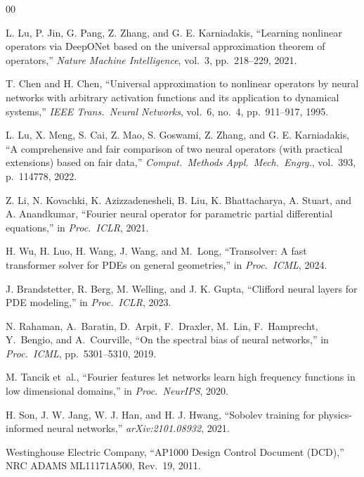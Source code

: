 \documentclass[journal]{IEEEtran}
\begin{document}
\begin{thebibliography}{00}

L. Lu, P. Jin, G. Pang, Z. Zhang, and G. E. Karniadakis,
``Learning nonlinear operators via DeepONet based on the universal approximation theorem of operators,''
\textit{Nature Machine Intelligence}, vol.~3, pp.~218--229, 2021.

T. Chen and H. Chen,
``Universal approximation to nonlinear operators by neural networks with arbitrary activation functions and its application to dynamical systems,''
\textit{IEEE Trans.\ Neural Networks}, vol.~6, no.~4, pp.~911--917, 1995.

L. Lu, X. Meng, S. Cai, Z. Mao, S. Goswami, Z. Zhang, and G. E. Karniadakis,
``A comprehensive and fair comparison of two neural operators (with practical extensions) based on fair data,''
\textit{Comput.\ Methods Appl.\ Mech.\ Engrg.}, vol.~393, p.~114778, 2022.

Z. Li, N. Kovachki, K. Azizzadenesheli, B. Liu, K. Bhattacharya, A. Stuart, and A. Anandkumar,
``Fourier neural operator for parametric partial differential equations,''
in \textit{Proc.\ ICLR}, 2021.

H. Wu, H. Luo, H. Wang, J. Wang, and M.~Long,
``Transolver: A fast transformer solver for PDEs on general geometries,''
in \textit{Proc.\ ICML}, 2024.

J. Brandstetter, R. Berg, M. Welling, and J. K. Gupta,
``Clifford neural layers for PDE modeling,''
in \textit{Proc.\ ICLR}, 2023.

N. Rahaman, A.~Baratin, D.~Arpit, F.~Draxler, M.~Lin, F.~Hamprecht, Y.~Bengio, and A.~Courville,
``On the spectral bias of neural networks,''
in \textit{Proc.\ ICML}, pp.~5301--5310, 2019.

M. Tancik et~al.,
``Fourier features let networks learn high frequency functions in low dimensional domains,''
in \textit{Proc.\ NeurIPS}, 2020.

H. Son, J. W. Jang, W. J. Han, and H. J. Hwang,
``Sobolev training for physics-informed neural networks,''
\textit{arXiv:2101.08932}, 2021.

Westinghouse Electric Company,
``AP1000 Design Control Document (DCD),''
NRC ADAMS ML11171A500, Rev.~19, 2011.


\end{thebibliography}
\end{document}
